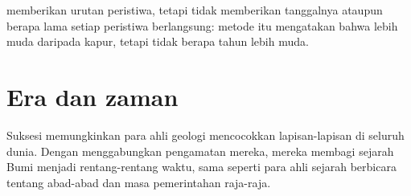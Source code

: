  memberikan urutan peristiwa, tetapi tidak memberikan
tanggalnya ataupun berapa lama setiap peristiwa berlangsung: metode itu
mengatakan bahwa  lebih muda daripada kapur, tetapi tidak berapa tahun
lebih muda.

\section{Era dan zaman}

Suksesi  memungkinkan para ahli geologi mencocokkan lapisan-lapisan di
seluruh dunia. Dengan menggabungkan pengamatan mereka, mereka membagi
sejarah Bumi menjadi rentang-rentang waktu, sama seperti para ahli sejarah
berbicara tentang abad-abad dan masa pemerintahan raja-raja.

